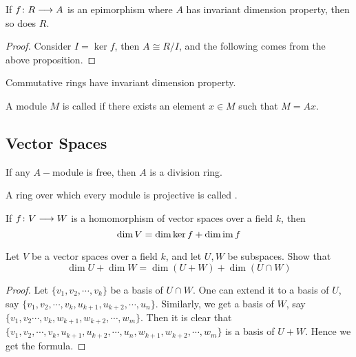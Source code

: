   \begin{prop}
    If $f\colon R\longrightarrow A$ is an epimorphism where $A$ has invariant dimension property, then so does $R$.
  \end{prop}
  \begin{proof}
    Consider $I=\ker f$, then $A\cong R/I$, and the following comes from the above proposition.
  \end{proof}

  \begin{prop}
    Commutative rings have invariant dimension property.
  \end{prop}


  \begin{defn}
    A module $M$ is called  if there exists an element $x\in M$ such that $M=Ax$.
  \end{defn}

\subsection{Vector Spaces}
  \begin{prop}
    If any $A-$module is free, then $A$ is a division ring.
  \end{prop}
  \begin{rem}
    A ring over which every module is projective is called .
  \end{rem}

  \begin{thm}
    If $f\colon V\longrightarrow W$ is a homomorphism of vector spaces over a field $k$, then
    \begin{equation*}
      \dim V=\dim\ker f+\dim\operatorname{im} f
    \end{equation*}
  \end{thm}

  \begin{ex}
    Let $V$ be a vector spaces over a field $k$, and let $U,W$ be subspaces. Show that
    \begin{equation*}
      \dim U+\dim W=\dim(U+W)+\dim(U\cap W)
    \end{equation*}
  \end{ex}
  \begin{proof}
    Let $\{v_1,v_2,\cdots,v_k\}$ be a basis of $U\cap W$. One can extend it to a basis of $U$, say $\{v_1,v_2,\cdots,v_k,u_{k+1},u_{k+2},\cdots,u_n\}$. Similarly, we get a basis of $W$, say $\{v_1,v_2\cdots,v_k,w_{k+1},w_{k+2},\cdots,w_m\}$.
    Then it is clear that $\{v_1,v_2,\cdots,v_k,u_{k+1},u_{k+2},\cdots,u_n,w_{k+1},w_{k+2},\cdots,w_m\}$ is a basis of $U+W$. Hence we get the formula.
  \end{proof}

